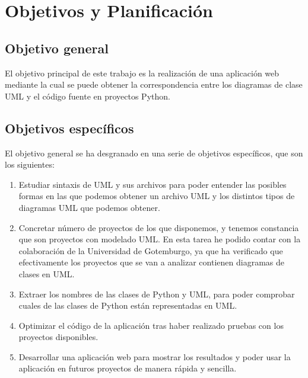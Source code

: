 \documentclass[a4paper, 12pt]{book}
\begin{document}
\cleardoublepage
\chapter{Objetivos y Planificación}
\label{chap:objetivos}

\section{Objetivo general}
\label{sec:objetivo-general}

El objetivo principal de este trabajo es la realización de una aplicación web mediante la cual se puede obtener la correspondencia entre los diagramas de clase UML y el código fuente en proyectos Python.


\section{Objetivos específicos}
\label{sec:objetivos-especificos}

El objetivo general se ha desgranado en una serie de objetivos específicos, que son los siguientes:

\begin{enumerate}
  \item Estudiar sintaxis de UML y sus archivos para poder entender las posibles formas en las que
  podemos obtener un archivo UML y los distintos tipos de diagramas UML que podemos obtener.
  \item Concretar número de proyectos de los que disponemos, y tenemos constancia que son proyectos
  con modelado UML. En esta tarea he podido contar con la colaboración de la Universidad de Gotemburgo, ya que ha verificado que efectivamente los proyectos que se van a analizar contienen diagramas de clases en UML.
  \item Extraer los nombres de las clases de Python y UML, para poder comprobar cuales de las clases de Python
  están representadas en UML.
  \item Optimizar el código de la aplicación tras haber realizado pruebas con los proyectos disponibles.
  \item Desarrollar una aplicación web para mostrar los resultados y poder usar la aplicación en futuros proyectos
  de manera rápida y sencilla.

\end{enumerate}
\end{document}
